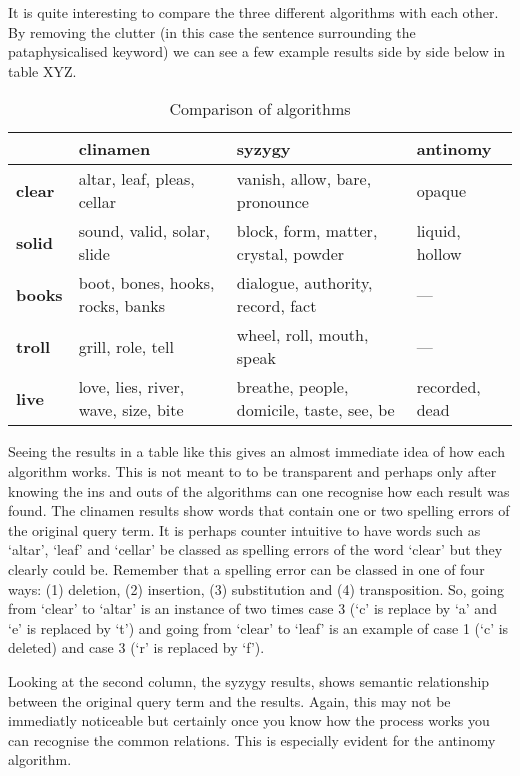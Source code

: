 It is quite interesting to compare the three different algorithms with each other. By removing the clutter (in this case the sentence surrounding the pataphysicalised keyword) we can see a few example results side by side below in table XYZ.

\begin{table}[htb]
  \begin{tabu}{X[1,L]|X[3,L]X[3,L]X[2,L]}
  \toprule
  &
  \textbf{clinamen}
  &
  \textbf{syzygy}
  &
  \textbf{antinomy}
  \\ \midrule
  \textbf{clear}
  &
  altar, leaf, pleas, cellar
  &
  vanish, allow, bare, pronounce
  &
  opaque
  \\ \midrule
  \textbf{solid}
  &
  sound, valid, solar, slide
  &
  block, form, matter, crystal, powder
  &
  liquid, hollow
  \\ \midrule
  \textbf{books}
  &
  boot, bones, hooks, rocks, banks
  &
  dialogue, authority, record, fact
  &
  ---
  \\ \midrule
  \textbf{troll}
  &
  grill, role, tell
  &
  wheel, roll, mouth, speak
  &
  ---
  \\ \midrule
  \textbf{live}
  &
  love, lies, river, wave, size, bite
  &
  breathe, people, domicile, taste, see, be
  &
  recorded, dead
  \\ \bottomrule
  \end{tabu}
\caption[Comparison of algorithms]{Comparison of algorithms}
\label{algorithmscomp}
\end{table}

Seeing the results in a table like this gives an almost immediate idea of how each algorithm works. This is not meant to to be transparent and perhaps only after knowing the ins and outs of the algorithms can one recognise how each result was found. The clinamen results show words that contain one or two spelling errors of the original query term. It is perhaps counter intuitive to have words such as `altar', `leaf' and `cellar' be classed as spelling errors of the word `clear' but they clearly could be. Remember that a spelling error can be classed in one of four ways: (1) deletion, (2) insertion, (3) substitution and (4) transposition. So, going from `clear' to `altar' is an instance of two times case 3 (`c' is replace by `a' and `e' is replaced by `t') and going from  `clear' to `leaf' is an example of case 1 (`c' is deleted) and case 3 (`r' is replaced by `f').

Looking at the second column, the syzygy results, shows semantic relationship between the original query term and the results. Again, this may not be immediatly noticeable but certainly once you know how the process works you can recognise the common relations. This is especially evident for the antinomy algorithm.

